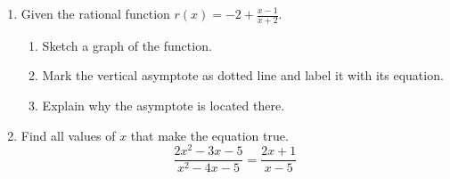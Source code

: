 \documentclass[12pt, twoside]{article}
\begin{document}
\begin{enumerate}
\newpage
\item Given the rational function $\displaystyle r(x)= -2 + \frac{x-1}{x+2}$. 
    \begin{enumerate}[itemsep=0.25cm]
        \item Sketch a graph of the function.
        \item Mark the vertical asymptote as dotted line and label it with its equation.
        \item Explain why the asymptote is located there.
    \end{enumerate}
    \begin{center}
    \end{center}

\item  Find all values of $x$ that make the equation true.
$$\frac{2x^2-3x-5}{x^2-4x-5}=\frac{2x+1}{x-5}$$ \vspace{4cm}

\end{enumerate}
\end{document}
